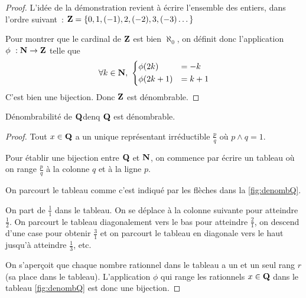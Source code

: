 \documentclass[a4paper,french,final]{memoir}
\begin{document}
\begin{proof}
L'idée de la démonstration revient à écrire l'ensemble des entiers, dans l'ordre suivant~:  $\mathbf{Z}=\left\lbrace 0,1,(-1),2,(-2),3,(-3) \dots\right\rbrace$ 

	Pour montrer que le cardinal de $\mathbf{Z}$ est bien $\aleph_0$, on définit donc l'application $\phi~: \NN \to \ZZ$ telle que \[ \forall k \in \NN, \
	\begin{dcases}
	\phi(2k)& = -k \\
	\phi(2k + 1)& = k+1
	\end{dcases}
\]
	C'est bien une bijection. Donc $\mathbf{Z}$ est dénombrable. 
\end{proof}
\begin{theoremb}{Dénombrabilité de $\mathbf{Q}$}{denq}
	$\mathbf{Q}$ est dénombrable.
\end{theoremb}
\begin{proof}
	Tout $x \in \mathbf{Q}$ a un unique représentant irréductible $\frac{p}{q}$ où $p \wedge q = 1$. 
	
	Pour établir une bijection entre $\mathbf{Q}$ et $\mathbf{N}$, on commence par écrire un tableau où on range $\frac{p}{q}$ à la colonne $q$ et à la ligne $p$.  
	
	On parcourt le tableau comme c'est indiqué par les flèches dans la \cref{fig:denombQ}. 
	
	On part de $\frac{1}{1}$ dans le tableau. On se déplace à la colonne suivante pour atteindre $\frac{1}{2}$. On parcourt le tableau diagonalement vers le bas pour atteindre $\frac{2}{1}$, on descend d'une case pour obtenir $\frac{3}{1}$ et on parcourt le tableau en diagonale vers le haut jusqu'à atteindre $\frac{1}{3}$, etc. 
	
	On s'aperçoit que chaque nombre rationnel dans le tableau a un et un seul rang $r$ (sa place dans le tableau). L'application $\phi$ qui range les rationnels $x \in \mathbf{Q}$ dans le tableau \cref{fig:denombQ} est donc une bijection.
\end{proof}
\end{document}
